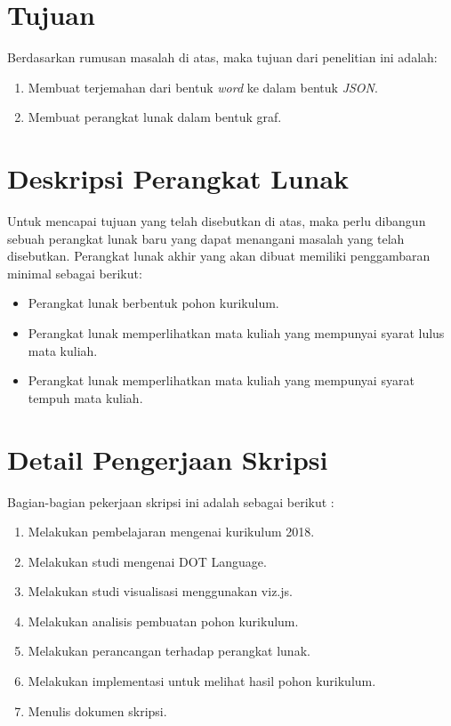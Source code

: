 \documentclass[a4paper,twoside]{article}
\begin{document}
\section{Tujuan}
Berdasarkan rumusan masalah di atas, maka tujuan dari penelitian ini adalah: 
\begin{enumerate}
\item Membuat terjemahan dari bentuk \textit{word} ke dalam bentuk \textit{JSON}.
\item Membuat perangkat lunak dalam bentuk graf.
\end{enumerate}


\section{Deskripsi Perangkat Lunak}
Untuk mencapai tujuan yang telah disebutkan di atas, maka perlu dibangun sebuah perangkat lunak baru yang dapat menangani masalah yang telah disebutkan. Perangkat lunak akhir yang akan dibuat memiliki penggambaran minimal sebagai berikut:

\begin{itemize}
	\item Perangkat lunak berbentuk pohon kurikulum.
	\item Perangkat lunak memperlihatkan mata kuliah yang mempunyai syarat lulus mata kuliah.	
	\item Perangkat lunak memperlihatkan mata kuliah yang mempunyai syarat tempuh mata kuliah.
\end{itemize}

\section{Detail Pengerjaan Skripsi}
Bagian-bagian pekerjaan skripsi ini adalah sebagai berikut :
	\begin{enumerate}
		\item Melakukan pembelajaran mengenai kurikulum 2018.
		\item Melakukan studi mengenai DOT Language.
		\item Melakukan studi visualisasi menggunakan viz.js.
		\item Melakukan analisis pembuatan pohon kurikulum.
		\item Melakukan perancangan terhadap perangkat lunak.
		\item Melakukan implementasi untuk melihat hasil pohon kurikulum.
		\item Menulis dokumen skripsi.
	\end{enumerate}
\end{document}
